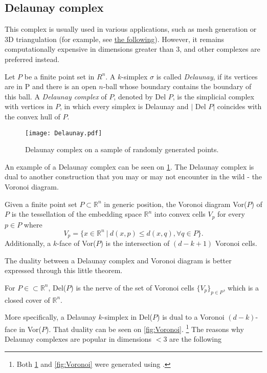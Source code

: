 \subsection{Delaunay complex}

This complex is usually used in various applications, such as mesh generation or 3D triangulation (for example, see \href{https://doc.cgal.org/latest/Manual/packages.html#PartTriangulationsAndDelaunayTriangulations}{the following}). However, it remains computationally expensive in dimensions greater than 3, and other complexes are preferred instead.

\begin{definition}
  Let $P$ be a finite point set in $R^{n}$. A $k$-simplex $\sigma$ is called \textit{Delaunay}, if its vertices are in P and there is an open $n$-ball whose boundary contains the boundary of this ball. A \textit{Delaunay complex} of $P$, denoted by Del $P$, is the simplicial complex with vertices in $P$, in which every simplex is Delaunay and $\vert$ Del $P \vert$ coincides with the convex hull of $P$.
\end{definition}

\begin{figure}[h!]
  \centering
  \texttt{[image: Delaunay.pdf]}
  \caption{Delaunay complex on a sample of randomly generated points.}
  \label{fig:Delaunay}
\end{figure}

An example of a Delaunay complex can be seen on \ref{fig:Delaunay}. The Delaunay complex is dual to another construction that you may or may not encounter in the wild - the Voronoi diagram.

\begin{definition}
  Given a finite point set $P \subset \mathbb{R}^{n}$ in generic position, the Voronoi diagram Vor($P$) of $P$ is the tessellation of the embedding space $\mathbb{R}^{n}$ into convex cells $V_{p}$ for every $p \in P$ where
  \begin{equation*}
    V_{p} = \{x \in \mathbb{R}^{n} \: \vert \: d(x,p) \leq d(x,q), \forall q \in P\}.
  \end{equation*}
  Additionally, a $k$-face of Vor($P$) is the intersection of $(d-k+1)$ Voronoi cells.
\end{definition}

The duality between a Delaunay complex and Voronoi diagram is better expressed through this little theorem.
\begin{theorem}
  For $P \in \subset \mathbb{R}^{n}$, Del($P$) is the nerve of the set of Voronoi cells $\{V_{p}\}_{p \in P}$, which is a closed cover of $\mathbb{R}^{n}$.
\end{theorem}
More specifically, a Delaunay $k$-simplex in Del($P$) is dual to a Voronoi $(d-k)$-face in Vor($P$). That duality can be seen on \ref{fig:Voronoi}.
\footnote{Both \ref{fig:Delaunay} and \ref{fig:Voronoi} were generated using \cite{2020SciPy-NMeth}.}
The reasons why Delaunay complexes are popular in dimensions $<3$ are the following


